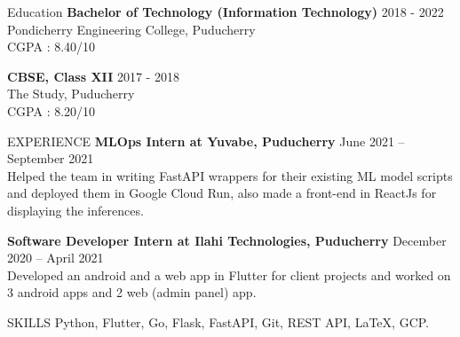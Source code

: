 \documentclass{template}
\begin{document}
\begin{rSection}{Education}
{\bf Bachelor of Technology (Information Technology)} \hfill {2018 - 2022}
\\ 
Pondicherry Engineering College, Puducherry \\
CGPA : 8.40/10

{\textbf{CBSE, Class XII}} \hfill 2017 - 2018\\
The Study, Puducherry \\
CGPA : 8.20/10

\end{rSection}

\begin{rSection}{EXPERIENCE}
\textbf{MLOps Intern at Yuvabe, Puducherry} \hfill June 2021 – September 2021 \\
Helped the team in writing FastAPI wrappers for their existing ML model scripts and deployed them in Google Cloud Run, also made a front-end in ReactJs for displaying the inferences.

\textbf{Software Developer Intern at Ilahi Technologies, Puducherry} \hfill December 2020 – April 2021 \\
Developed an android and a web app in Flutter for client projects and worked on 3 android apps and 2 web (admin panel) app.

\end{rSection} 

\begin{rSection}{SKILLS}
Python, Flutter, Go, Flask, FastAPI, Git, REST API, \LaTeX, GCP.

\end{rSection}
\end{document}
